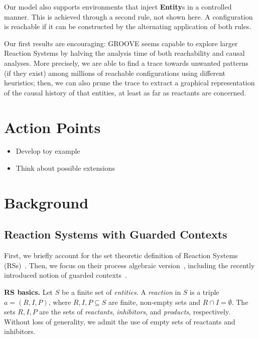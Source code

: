 \documentclass[sn-mathphys-num,a4paper,iicol,lineno,pdflatex]{sn-jnl-hacked}
\newcommand{\lab}[1]{\textsf{#1}}
\newcommand{\blab}[1]{\lab{\bfseries #1}}
\theoremstyle{thmstyleone}%
\theoremstyle{thmstyletwo}%
\theoremstyle{thmstylethree}%
\begin{document}
Our model also supports environments that inject \blab{Entity}s in a controlled manner. This is achieved through a second rule, not shown here. A configuration is reachable if it can be constructed by the alternating application of both rules.

\medskip\noindent
Our first results are encouraging: GROOVE seems capable to explore larger Reaction Systems 
by halving the analysis time of both reachability and causal analyses.
More precisely, we are able to find a trace towards unwanted patterns (if they exist) among millions of reachable configurations using different heuristics; then, we can also prune the trace to extract a graphical representation of the causal history of that entities, at least as far as reactants are concerned.

\section{Action Points}
\begin{itemize}
\item Develop toy example
\item Think about possible extensions
\end{itemize}


\section{Background}

\subsection{Reaction Systems with Guarded Contexts}

First, we briefly account for the set theoretic definition of Reaction Systems (RSs)~\cite{DBLP:journals/fuin/EhrenfeuchtR07}. Then, we focus on their process algebraic version~\cite{DBLP:journals/tcs/BrodoBF21}, including the recently introduced notion of guarded contexts~\cite{DBLP:conf/cmsb/BowlesBBFGM24}.


\medskip
\noindent
\textbf{RS basics.}
Let $S$ be a finite set of \emph{entities}. 
A \emph{reaction} in $S$ is a triple $a = (R,I,P)$, where $R, I, P\subseteq S$ are finite, non-empty sets and $R \cap I = \emptyset$. 
The sets $R, I, P$ are the sets of \emph{reactants}, \emph{inhibitors}, and  \emph{products}, respectively. 
Without loss of generality, we admit the use of empty sets of reactants and inhibitors.
\end{document}
